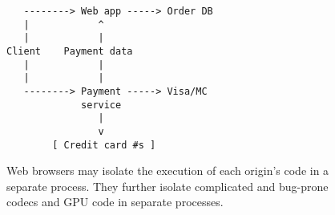 \begin{figure}
\begin{verbatim}
   --------> Web app -----> Order DB
   |            ^
   |            |
Client    Payment data 
   |            |
   |            |
   --------> Payment -----> Visa/MC
             service   
                | 
                v
        [ Credit card #s ]
\end{verbatim}
\caption{Web browsers may isolate the execution of each origin's 
  code in a separate process. They further isolate complicated
  and bug-prone codecs and GPU code in separate processes.}
\end{figure}
